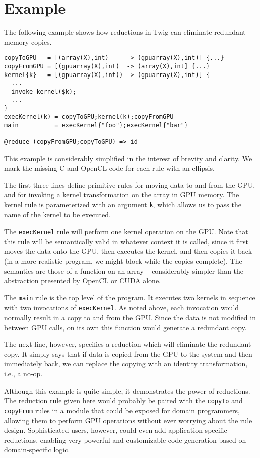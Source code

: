 
\section{Example}

The following example shows how reductions in Twig can eliminate redundant
memory copies.

\begin{verbatim}
copyToGPU   = [(array(X),int)     -> (gpuarray(X),int)] {...}
copyFromGPU = [(gpuarray(X),int)  -> (array(X),int] {...}
kernel{k}   = [(gpuarray(X),int)) -> (gpuarray(X),int)] {
  ...
  invoke_kernel($k);
  ...
}
execKernel(k) = copyToGPU;kernel(k);copyFromGPU
main          = execKernel{"foo"};execKernel{"bar"}

@reduce (copyFromGPU;copyToGPU) => id	
\end{verbatim}

This example is considerably simplified in the interest of brevity and clarity.
We mark the missing C and OpenCL code for each rule with an ellipsis.

The first three lines define primitive rules for moving data to and from the
GPU, and for invoking a kernel transformation on the array in GPU memory. The
kernel rule is parameterized with an argument \texttt{k}, which allows us to
pass the name of the kernel to be executed.

The \texttt{execKernel} rule will perform one kernel operation on the GPU. Note
that this rule will be semantically valid in whatever context it is called,
since it first moves the data onto the GPU, then executes the kernel, and then
copies it back (in a more realistic program, we might block while the copies
complete). The semantics are those of a function on an array -- considerably
simpler than the abstraction presented by OpenCL or CUDA alone.

The \texttt{main} rule is the top level of the program. It executes two kernels
in sequence with two invocations of \texttt{execKernel}. As noted above, each
invocation would normally result in a copy to and from the GPU. Since the data
is not modified in between GPU calls, on its own this function would generate a
redundant copy.

The next line, however, specifies a reduction which will eliminate the redundant
copy. It simply says that if data is copied from the GPU to the system and then
immediately back, we can replace the copying with an identity transformation,
i.e., a no-op.

Although this example is quite simple, it demonstrates the power of reductions.
The reduction rule given here would probably be paired with the \texttt{copyTo}
and \texttt{copyFrom} rules in a module that could be exposed for domain
programmers, allowing them to perform GPU operations without ever worrying about
the rule design. Sophisticated users, however, could even add
application-specific reductions, enabling very powerful and customizable code
generation based on domain-specific logic.
